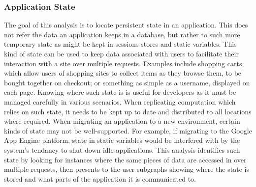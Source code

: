 \documentclass[msc,oneside]{ubcthesis}
\begin{document}
%
%

\subsubsection{Application State}
The goal of this analysis is to locate persistent state in an application. This does not refer the data an application keeps in a database, but rather to such more temporary state as might be kept in sessions stores and static variables. This kind of state can be used to keep data associated with users to facilitate their interaction with a site over multiple requests. Examples include shopping carts, which allow users of shopping sites to collect items as they browse them, to be bought together on checkout; or something as simple as a username, displayed on each page. Knowing where such state is is useful for developers as it must be managed carefully in various scenarios. When replicating computation which relies on such state, it needs to be kept up to date and distributed to all locations where required. When migrating an application to a new environment, certain kinds of state may not be well-supported. For example, if migrating to the Google App Engine platform, state in static variables would be interfered with by the system's tendancy to shut down idle applications. This analysis identifies such state by looking for instances where the same pieces of data are accessed in over multiple requests, then presents to the user subgraphs showing where the state is stored and what parts of the application it is communicated to.\\
\end{document}
